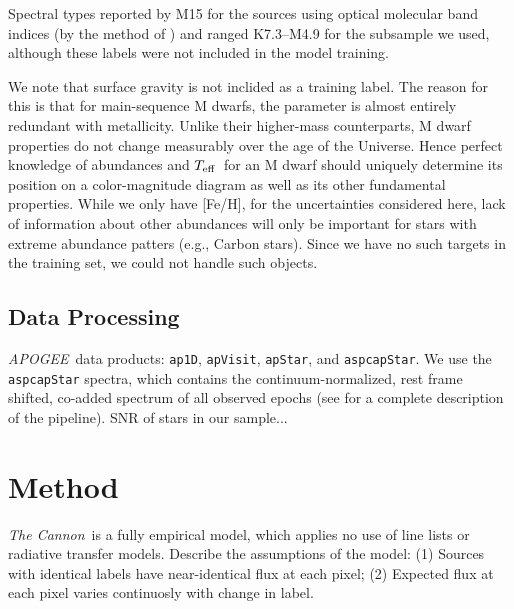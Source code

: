 \documentclass[modern]{aastex62}
\newcommand{\apogee}{\textsl{APOGEE}}
\newcommand{\thecannon}{\textsl{The Cannon}}
\newcommand{\teff}{$T_{\rm eff}$}
\begin{document}
Spectral types reported by M15 for the sources using optical molecular band indices (by the method of \citealt{Lepine:2013}) and ranged K7.3--M4.9 for the subsample we used, although these labels were not included in the model training.

We note that surface gravity is not inclided as a training label. The reason for this is that for main-sequence M dwarfs, the parameter is almost entirely redundant with metallicity. Unlike their higher-mass counterparts, M dwarf properties do not change measurably over the age of the Universe. Hence perfect knowledge of abundances and \teff\ for an M dwarf should uniquely determine its position on a color-magnitude diagram as well as its other fundamental properties. While we only have [Fe/H], for the uncertainties considered here, lack of information about other abundances will only be important for stars with extreme abundance patters (e.g., Carbon stars). Since we have no such targets in the training set, we could not handle such objects. 


\subsection{Data Processing}

\apogee\ data products: {\tt\string ap1D}, {\tt\string apVisit}, {\tt\string apStar}, and {\tt\string aspcapStar}. We use the {\tt\string aspcapStar} spectra, which contains the continuum-normalized, rest frame shifted, co-added spectrum of all observed epochs (see \citealt{Perez:2016} for a complete description of the pipeline). SNR of stars in our sample...


\section{Method}\label{sec:cannon}

\thecannon\ is a fully empirical model, which applies no use of line lists or radiative transfer models. Describe the assumptions of the model: (1) Sources with identical labels have near-identical flux at each pixel; (2) Expected flux at each pixel varies continuosly with change in label. 
\end{document}
